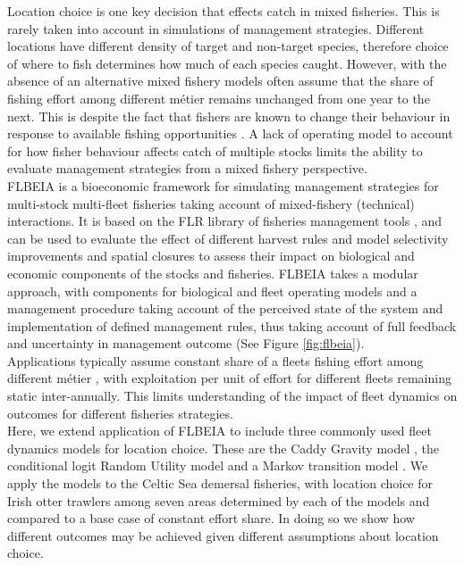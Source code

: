 \documentclass[12pt, halfline, a4paper]{ouparticle}
\begin{document}
Location choice is one key decision that effects catch in mixed fisheries. This
is rarely taken into account in simulations of management strategies. Different
locations have different density of target and non-target species, therefore
choice of where to fish determines how much of each species caught. However,
with the absence of an alternative mixed fishery models often assume that the
share of fishing effort among different métier remains unchanged from one year
to the next. This is despite the fact that fishers are known to change their
behaviour in response to available fishing opportunities
\citep{VanPutten2012a}. A lack of operating model to account for how fisher
behaviour affects catch of multiple stocks limits the ability to evaluate
management strategies from a mixed fishery perspective. \\

FLBEIA \citep{Garcia2017} is a bioeconomic framework for simulating management
strategies for multi-stock multi-fleet fisheries taking account of
mixed-fishery (technical) interactions. It is based on the FLR library of
fisheries management tools \citep{Kell2007}, and can be used to evaluate the
effect of different harvest rules and model selectivity improvements and
spatial closures to assess their impact on biological and economic components
of the stocks and fisheries. FLBEIA takes a modular approach, with components
for biological and fleet operating models and a management procedure taking
account of the perceived state of the system and implementation of defined
management rules, thus taking account of full feedback and uncertainty in
management outcome (See Figure \ref{fig:flbeia}). \\

Applications typically assume constant share of a fleets fishing effort among
different métier \citep{Ulrich2016, Garcia2020}, with exploitation per unit of
effort for different fleets remaining static inter-annually. This limits
understanding of the impact of fleet dynamics on outcomes for different
fisheries strategies. \\ 

Here, we extend application of FLBEIA to include three commonly used fleet
dynamics models for location choice. These are the Caddy Gravity model
\citep{Caddy1975}, the conditional logit Random Utility model
\citep{McFadden1973} and a Markov transition model \citep{Venables2009}. We
apply the models to the Celtic Sea demersal fisheries, with location choice for
Irish otter trawlers among seven areas determined by each of the models and
compared to a base case of constant effort share. In doing so we show how
different outcomes may be achieved given different assumptions about location
choice. \\
\end{document}
